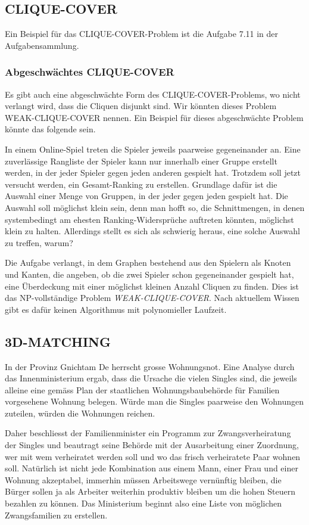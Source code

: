 \subsection{CLIQUE-COVER}
Ein Beispiel für das CLIQUE-COVER-Problem ist die Aufgabe 7.11 in der
Aufgabensammlung.

\subsubsection{Abgeschwächtes CLIQUE-COVER}
Es gibt auch eine abgeschwächte Form des CLIQUE-COVER-Problems, wo
nicht verlangt wird, dass die Cliquen disjunkt sind.
Wir könnten dieses Problem WEAK-CLIQUE-COVER nennen.
Ein Beispiel für dieses abgeschwächte Problem könnte das folgende sein.

\medskip

In einem Online-Spiel treten die Spieler jeweils paarweise gegeneinander an.
Eine zuverlässige Rangliste der Spieler kann nur innerhalb
einer Gruppe erstellt werden, in der jeder Spieler gegen
jeden anderen gespielt hat.
Trotzdem soll jetzt versucht werden,
ein Gesamt-Ranking zu erstellen.
Grundlage dafür ist die Auswahl
einer Menge von Gruppen, in der jeder gegen jeden gespielt hat.
Die Auswahl soll möglichst klein sein, denn man hofft so, die
Schnittmengen, in denen systembedingt am ehesten Ranking-Widersprüche
auftreten könnten, möglichst klein zu halten.
Allerdings stellt es
sich als schwierig heraus, eine solche Auswahl zu treffen, warum?

\medskip

Die Aufgabe verlangt, in dem Graphen bestehend aus den Spielern
als Knoten und Kanten, die angeben, ob die zwei Spieler schon gegeneinander
gespielt hat, eine Überdeckung mit einer möglichst
kleinen Anzahl Cliquen zu finden.
Dies ist das NP-vollständige Problem {\it WEAK-CLIQUE-COVER}.
Nach aktuellem Wissen gibt es dafür keinen
Algorithmus mit polynomieller Laufzeit.

\subsection{3D-MATCHING}
In der Provinz Gnichtam De herrscht grosse Wohnungsnot.
Eine Analyse durch das Innenministerium ergab, dass die Ursache
die vielen Singles sind, die jeweils alleine eine gemäss
Plan der staatlichen Wohnungsbaubehörde für Familien vorgesehene
Wohnung belegen.
Würde man die Singles paarweise den Wohnungen zuteilen, würden die
Wohnungen reichen.

Daher beschliesst der Familienminister ein Programm zur Zwangsverheiratung
der Singles und beautragt seine Behörde mit der Ausarbeitung einer Zuordnung,
wer mit wem verheiratet werden soll und wo das frisch verheiratete Paar
wohnen soll.
Natürlich ist nicht jede Kombination aus einem Mann,
einer Frau und einer Wohnung akzeptabel, immerhin müssen 
Arbeitswege vernünftig bleiben, die Bürger sollen ja als 
Arbeiter weiterhin produktiv bleiben um die hohen Steuern bezahlen zu können.
Das Ministerium beginnt also eine Liste von möglichen Zwangsfamilien
zu erstellen.

